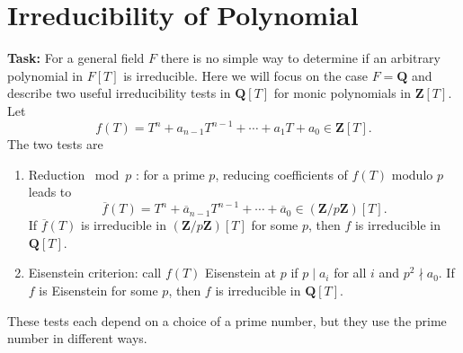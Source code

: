 \section{Irreducibility of Polynomial}

\textbf{Task:} For a general field $F$ there is no simple way to determine if an arbitrary polynomial in $F[T]$ is irreducible. Here we will focus on the case $F=\mathbf{Q}$ and describe two useful irreducibility tests in $\mathbf{Q}[T]$ for monic polynomials in $\mathbf{Z}[T]$. Let
\[
f(T)=T^n+a_{n-1} T^{n-1}+\cdots+a_1 T+a_0 \in \mathbf{Z}[T] .
\]
The two tests are

\begin{enumerate}
	\item Reduction $\bmod p$ : for a prime $p$, reducing coefficients of $f(T)$ modulo $p$ leads to
\[
\overline{f}(T)=T^n+\overline{a}_{n-1} T^{n-1}+\cdots+\overline{a}_0 \in(\mathbf{Z} / p \mathbf{Z})[T] .
\]If $\overline{f}(T)$ is irreducible in $(\mathbf{Z} / p \mathbf{Z})[T]$ for some $p$, then $f$ is irreducible in $\mathbf{Q}[T]$.
	\item Eisenstein criterion: call $f(T)$ Eisenstein at $p$ if $p \mid a_i$ for all $i$ and $p^2 \nmid  a_0$. If $f$ is Eisenstein for some $p$, then $f$ is irreducible in $\mathbf{Q}[T]$.
\end{enumerate}

These tests each depend on a choice of a prime number, but they use the prime number in different ways.
